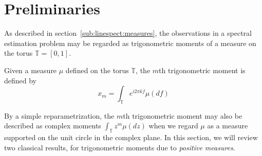 
\section{Preliminaries} %
\label{sec:preliminaries}

As described in section~\ref{sub:linespect:measures}, the observations in a
spectral estimation problem may be regarded as trigonometric moments of a
measure on the torus $\mathbb{T} = [0,1].$

\begin{definition}
Given a measure $\mu$ defined on the torus $\mathbb{T}$, the $m$th
trigonometric moment is defined by
\begin{equation}
	\label{eq:trig-moment-measure}
	x_m = \int_\mathbb{T} e^{i 2 \pi k f} \mu ( d f)
\end{equation}
\end{definition}

By a simple reparametrization, the $m$th trigonometric moment may also be
described as complex moments $\int_\mathbb{T} z^m \mu(dz)$ when we regard $\mu$
as a measure supported on the unit circle in the complex plane. In this section,
we will review two classical results, for trigonometric moments due to \emph{positive measures}.

